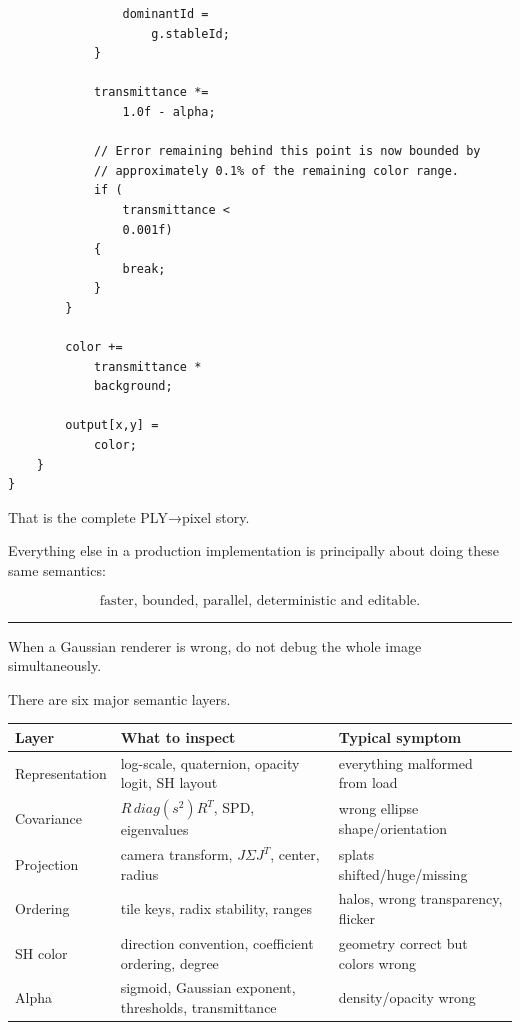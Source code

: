\begin{verbatim}
                dominantId =
                    g.stableId;
            }

            transmittance *=
                1.0f - alpha;

            // Error remaining behind this point is now bounded by
            // approximately 0.1% of the remaining color range.
            if (
                transmittance <
                0.001f)
            {
                break;
            }
        }

        color +=
            transmittance *
            background;

        output[x,y] =
            color;
    }
}
\end{verbatim}

That is the complete PLY→pixel story.

Everything else in a production implementation is principally about doing these same semantics:

\[
\boxed{
\text{faster, bounded, parallel, deterministic and editable}.
}
\]

\begin{center}\rule{0.5\linewidth}{0.5pt}\end{center}

When a Gaussian renderer is wrong, do not debug the whole image simultaneously.

There are six major semantic layers.

{\def\LTcaptype{none} %
\begin{longtable}[]{@{}
  >{\raggedright\arraybackslash}p{}
  >{\raggedright\arraybackslash}p{}
  >{\raggedright\arraybackslash}p{}@{}}
\toprule\noalign{}
\begin{minipage}[b]{\linewidth}\raggedright
Layer
\end{minipage} & \begin{minipage}[b]{\linewidth}\raggedright
What to inspect
\end{minipage} & \begin{minipage}[b]{\linewidth}\raggedright
Typical symptom
\end{minipage} \\
\midrule\noalign{}
\endhead
\bottomrule\noalign{}
\endlastfoot
Representation & log-scale, quaternion, opacity logit, SH layout & everything malformed from load \\
Covariance & \(R\,diag(s^2)R^T\), SPD, eigenvalues & wrong ellipse shape/orientation \\
Projection & camera transform, \(J\Sigma J^T\), center, radius & splats shifted/huge/missing \\
Ordering & tile keys, radix stability, ranges & halos, wrong transparency, flicker \\
SH color & direction convention, coefficient ordering, degree & geometry correct but colors wrong \\
Alpha & sigmoid, Gaussian exponent, thresholds, transmittance & density/opacity wrong \\
\end{longtable}
}

